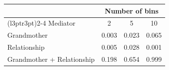 
\begin{tabular}{lccc}
\toprule
\multicolumn{1}{c}{ } & \multicolumn{3}{c}{Number of bins} \\
\cmidrule(l{3pt}r{3pt}){2-4}
Mediator & 2 & 5 & 10\\
\midrule
Grandmother & 0.003 & 0.023 & 0.065\\
Relationship & 0.005 & 0.028 & 0.001\\
Grandmother + Relationship & 0.198 & 0.654 & 0.999\\
\bottomrule
\end{tabular}
